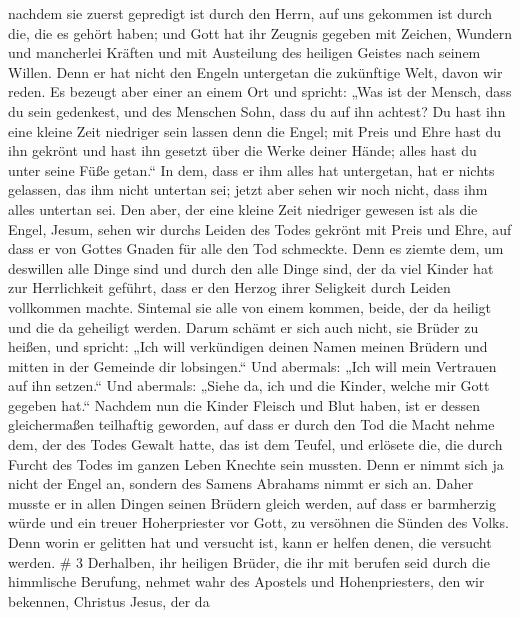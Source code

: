 nachdem sie zuerst gepredigt ist durch den Herrn, auf uns gekommen ist
durch die, die es gehört haben;  und Gott hat ihr Zeugnis
gegeben mit Zeichen, Wundern und mancherlei Kräften und mit Austeilung
des heiligen Geistes nach seinem Willen.  Denn er hat nicht
den Engeln untergetan die zukünftige Welt, davon wir reden. 
Es bezeugt aber einer an einem Ort und spricht: „Was ist der Mensch,
dass du sein gedenkest, und des Menschen Sohn, dass du auf ihn achtest?
 Du hast ihn eine kleine Zeit niedriger sein lassen denn die
Engel; mit Preis und Ehre hast du ihn gekrönt und hast ihn gesetzt über
die Werke deiner Hände;  alles hast du unter seine Füße
getan.`` In dem, dass er ihm alles hat untergetan, hat er nichts
gelassen, das ihm nicht untertan sei; jetzt aber sehen wir noch nicht,
dass ihm alles untertan sei.  Den aber, der eine kleine Zeit
niedriger gewesen ist als die Engel, Jesum, sehen wir durchs Leiden des
Todes gekrönt mit Preis und Ehre, auf dass er von Gottes Gnaden für alle
den Tod schmeckte.  Denn es ziemte dem, um deswillen alle
Dinge sind und durch den alle Dinge sind, der da viel Kinder hat zur
Herrlichkeit geführt, dass er den Herzog ihrer Seligkeit durch Leiden
vollkommen machte.  Sintemal sie alle von einem kommen,
beide, der da heiligt und die da geheiligt werden. Darum schämt er sich
auch nicht, sie Brüder zu heißen,  und spricht: „Ich will
verkündigen deinen Namen meinen Brüdern und mitten in der Gemeinde dir
lobsingen.``  Und abermals: „Ich will mein Vertrauen auf
ihn setzen.`` Und abermals: „Siehe da, ich und die Kinder, welche mir
Gott gegeben hat.``  Nachdem nun die Kinder Fleisch und
Blut haben, ist er dessen gleichermaßen teilhaftig geworden, auf dass er
durch den Tod die Macht nehme dem, der des Todes Gewalt hatte, das ist
dem Teufel,  und erlösete die, die durch Furcht des Todes
im ganzen Leben Knechte sein mussten.  Denn er nimmt sich
ja nicht der Engel an, sondern des Samens Abrahams nimmt er sich an.
 Daher musste er in allen Dingen seinen Brüdern gleich
werden, auf dass er barmherzig würde und ein treuer Hoherpriester vor
Gott, zu versöhnen die Sünden des Volks.  Denn worin er
gelitten hat und versucht ist, kann er helfen denen, die versucht
werden. \# 3  Derhalben, ihr heiligen Brüder, die ihr mit
berufen seid durch die himmlische Berufung, nehmet wahr des Apostels und
Hohenpriesters, den wir bekennen, Christus Jesus,  der da
